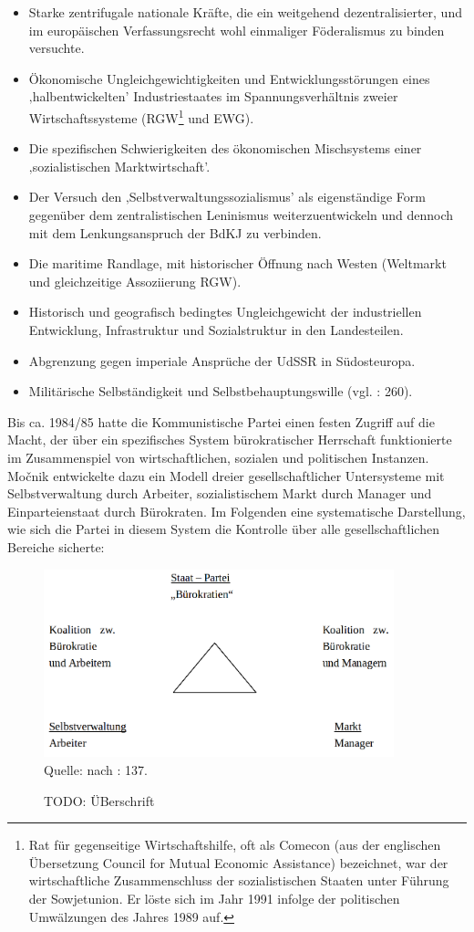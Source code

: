 \begin{itemize}
\item Starke zentrifugale nationale Kräfte, die ein weitgehend dezentralisierter, und im europäischen Verfassungsrecht wohl einmaliger Föderalismus zu binden versuchte.
\item Ökonomische Ungleichgewichtigkeiten und Entwicklungsstörungen eines ‚halbentwickelten’ Industriestaates im Spannungsverhältnis zweier Wirtschaftssysteme (RGW\footnote{Rat für gegenseitige Wirtschaftshilfe, oft als Comecon (aus der englischen Übersetzung Council for Mutual Economic Assistance) bezeichnet, war der wirtschaftliche Zusammenschluss der sozialistischen Staaten unter Führung der Sowjetunion. Er löste sich im Jahr 1991 infolge der politischen Umwälzungen des Jahres 1989 auf.} und EWG).
\item Die spezifischen Schwierigkeiten des ökonomischen Mischsystems einer ‚sozialistischen Marktwirtschaft’.
\item Der Versuch den ‚Selbstverwaltungssozialismus’ als eigenständige Form gegenüber dem zentralistischen Leninismus weiterzuentwickeln und dennoch mit dem Lenkungsanspruch der BdKJ zu verbinden.
\item Die maritime Randlage, mit historischer Öffnung nach Westen (Weltmarkt und gleichzeitige Assoziierung RGW).
\item Historisch und geografisch bedingtes Ungleichgewicht der industriellen Entwicklung, Infrastruktur und Sozialstruktur in den Landesteilen.
\item Abgrenzung gegen imperiale Ansprüche der UdSSR in Südosteuropa.
\item Militärische Selbständigkeit und Selbstbehauptungswille (vgl. \cite{roggemann} : 260).
\end{itemize}
Bis ca. 1984/85 hatte die Kommunistische Partei einen festen Zugriff auf die Macht, der über ein spezifisches System bürokratischer Herrschaft funktionierte im Zusammenspiel von wirtschaftlichen, sozialen und politischen Instanzen. Močnik entwickelte dazu ein Modell dreier gesellschaftlicher Untersysteme mit Selbstverwaltung durch Arbeiter, sozialistischem Markt durch Manager und Einparteienstaat durch Bürokraten. Im Folgenden eine systematische Darstellung, wie sich die Partei in diesem System die Kontrolle über alle gesellschaftlichen Bereiche sicherte:
\begin{figure}[H]
\setlength\belowcaptionskip{10pt}
 \caption{TODO: ÜBerschrift}
  \centering
  \includegraphics[width=4in]{Material/Parteienbuerokratie}\\
\vspace{0,5cm}
Quelle: nach \cite{mocnik} : 137.
\end{figure}

